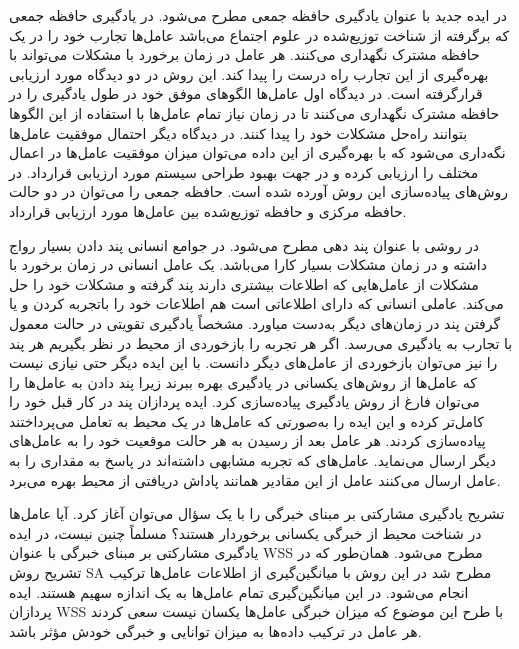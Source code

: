 در ایده جدید با عنوان یادگیری حافظه جمعی مطرح می‌شود. در یادگیری حافظه جمعی که برگرفته از شناخت توزیع‌شده در علوم اجتماع می‌باشد عامل‌ها تجارب خود را در یک حافظه مشترک نگهداری می‌کنند. هر عامل در زمان برخورد با مشکلات می‌تواند با بهره‌گیری از این تجارب راه درست را پیدا کند.
این روش در دو دیدگاه مورد ارزیابی قرارگرفته است. در دیدگاه اول عامل‌ها الگوهای موفق خود در طول یادگیری را در حافظه مشترک نگهداری می‌کنند تا در زمان نیاز تمام عامل‌ها با استفاده از این الگوها بتوانند راه‌حل مشکلات خود را پیدا کنند. در دیدگاه دیگر احتمال موفقیت عامل‌ها نگه‌داری می‌شود که با بهره‌گیری از این داده می‌توان میزان موفقیت عامل‌ها در اعمال مختلف را ارزیابی کرده و در جهت بهبود طراحی سیستم مورد ارزیابی قرارداد. در روش‌های پیاده‌سازی این روش آورده شده است. حافظه جمعی را می‌توان در دو حالت حافظه مرکزی و حافظه توزیع‌شده بین عامل‌ها مورد ارزیابی قرارداد.

در روشی با عنوان پند دهی مطرح می‌شود. در جوامع انسانی پند دادن بسیار رواج داشته و در زمان مشکلات بسیار کارا می‌باشد. یک عامل انسانی در زمان برخورد با مشکلات از عامل‌هایی که اطلاعات بیشتری دارند پند گرفته و مشکلات خود را حل می‌کند. عاملی انسانی که دارای اطلاعاتی است هم اطلاعات خود را باتجربه کردن و یا گرفتن پند در زمان‌های دیگر به‌دست میاورد. مشخصاً یادگیری تقویتی در حالت معمول با تجارب به یادگیری می‌رسد. اگر هر تجربه را بازخوردی از محیط در نظر بگیریم هر پند را نیز می‌توان بازخوردی از عامل‌های دیگر دانست. با این ایده دیگر حتی نیازی نیست که عامل‌ها از روش‌های یکسانی در یادگیری بهره ببرند زیرا پند دادن به عامل‌ها را می‌توان فارغ از روش یادگیری پیاده‌سازی کرد.
ایده پردازان پند در کار قبل خود را کامل‌تر کرده و این ایده را به‌صورتی که عامل‌ها در یک محیط به تعامل می‌پرداختند پیاده‌سازی کردند. هر عامل بعد از رسیدن به هر حالت موقعیت خود را به عامل‌های دیگر ارسال می‌نماید. عامل‌های که تجربه مشابهی داشته‌اند در پاسخ به مقداری را به عامل ارسال می‌کنند عامل از این مقادیر همانند پاداش دریافتی از محیط بهره می‌برد.

تشریح یادگیری مشارکتی بر مبنای خبرگی را با یک سؤال می‌توان آغاز کرد. آیا عامل‌ها در شناخت محیط از خبرگی یکسانی برخوردار هستند؟ مسلماً چنین نیست، در ایده یادگیری مشارکتی بر مبنای خبرگی با عنوان WSS مطرح می‌شود.
همان‌طور که در تشریح روش SA مطرح شد در این روش با میانگین‌گیری از اطلاعات عامل‌ها ترکیب انجام می‌شود. در این میانگین‌گیری تمام عامل‌ها به یک اندازه سهیم هستند. ایده پردازان WSS با طرح این موضوع که میزان خبرگی عامل‌ها یکسان نیست سعی کردند هر عامل در ترکیب داده‌ها به میزان توانایی و خبرگی خودش مؤثر باشد.

